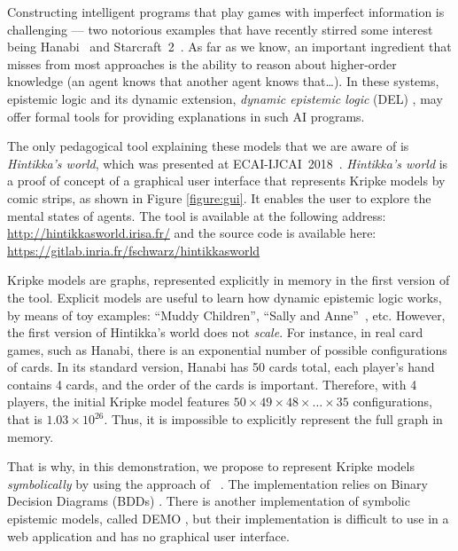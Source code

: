Constructing intelligent programs that play games with imperfect information is challenging --- two notorious examples that have recently stirred some interest being Hanabi~\cite{DBLP:journals/corr/abs-1902-00506} and Starcraft~2~\cite{DBLP:conf/ijcai/HuLLPX18}. As far as we know, an important ingredient that misses from most approaches is the ability to reason about higher-order knowledge (an agent knows that another agent knows that\dots). In these systems, epistemic logic and its dynamic extension, \emph{dynamic epistemic logic} (DEL) \cite{baltag1998logic}, \cite{DitmarschvdHoekKooi} may offer formal tools for providing explanations in such AI programs. 

The only pedagogical tool explaining these models that we are aware of is \emph{Hintikka's world}, which was presented at ECAI-IJCAI~2018~\cite{DBLP:conf/ijcai/Schwarzentruber18}. 
\emph{Hintikka's world} is a proof of concept of a graphical user interface that represents Kripke models by  comic strips, as shown in Figure \ref{figure:gui}. It enables the user to explore the mental states of agents. The tool is available at the following address:
\url{http://hintikkasworld.irisa.fr/} and the source code is available here:
\url{https://gitlab.inria.fr/fschwarz/hintikkasworld}


Kripke models are graphs, represented explicitly in memory in the first version of the tool. Explicit models are useful to learn how dynamic epistemic logic works, by means of toy examples: ``Muddy Children'', ``Sally and Anne''~\cite{wimmer1983beliefs}, etc.  However, the first version of Hintikka's world does not \emph{scale}. For instance, in real card games, such as Hanabi, there is an exponential number of possible configurations of cards. In its standard version, Hanabi has 50 cards total, each player's hand contains 4 cards, and the order of the cards is important. Therefore, with 4 players, the initial Kripke model features $50 \times 49 \times 48 \times \dots \times 35$ configurations, that is %
$1.03 \times 10^{26}$.
Thus, it is impossible to explicitly represent the full graph in memory.



That is why, in this demonstration, we propose to represent Kripke models \emph{symbolically} by using the approach of \citeauthor{DBLP:conf/atal/CharrierS17}~. The implementation relies on Binary Decision Diagrams (BDDs) \cite{DBLP:journals/tc/Bryant86}. There is another implementation of symbolic epistemic models, called DEMO \cite{DBLP:conf/lori/BenthemEGS15}, but their implementation is difficult to use in a web application and has no graphical user interface. %







